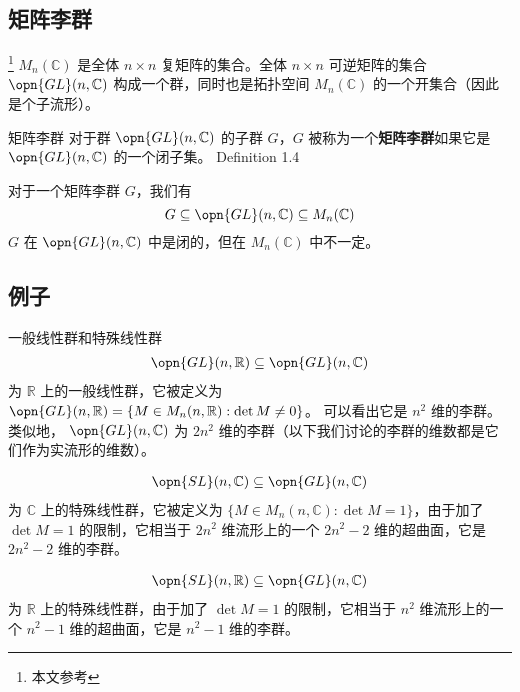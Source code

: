 
\begin{issues}
\issueDraft
\end{issues}


\subsection{矩阵李群}

\footnote{本文参考\cite{GTM222}} $M_n(\mathbb{C})$ 是全体 $n \times n$ 复矩阵的集合。全体 $n \times n$ 可逆矩阵的集合 $\opn{GL}(n, \mathbb{C})$ 构成一个群，同时也是拓扑空间 $M_n(\mathbb{C})$ 的一个开集合（因此是个子流形）。

\begin{definition}{矩阵李群}
对于群 $\opn{GL}(n, \mathbb{C})$ 的子群 $G$，$G$ 被称为一个\textbf{矩阵李群}如果它是 $\opn{GL}(n, \mathbb{C})$ 的一个闭子集。 Definition 1.4 \cite{GTM222} 
\end{definition}

对于一个矩阵李群 $G$，我们有
$$
G \subseteq \opn{GL}(n, \mathbb{C}) \subseteq M_n(\mathbb{C})
$$
$G$ 在 $\opn{GL}(n, \mathbb{C})$ 中是闭的，但在 $M_n(\mathbb{C})$ 中不一定。

\subsection{例子}

\begin{example}{一般线性群和特殊线性群}
\begin{equation}
\begin{aligned}
\opn{GL}(n, \mathbb{R}) \subseteq \opn{GL}(n, \mathbb{C})
\end{aligned}
\end{equation}
为 $\mathbb R$ 上的一般线性群，它被定义为 $\opn{GL}(n,\mathbb R)=\{M\in M_n(n,\mathbb{R}): \det M\neq 0 \}$。
可以看出它是 $n^2$ 维的李群。类似地， ${\opn{GL}(n,\mathbb{C})}$ 为 $2n^2$ 维的李群（以下我们讨论的李群的维数都是它们作为实流形的维数）。

\begin{equation}
\begin{aligned}
\opn{SL}(n, \mathbb{C}) \subseteq \opn{GL}(n, \mathbb{C})
\end{aligned}
\end{equation}
为 $\mathbb C$ 上的特殊线性群，它被定义为 $\{M\in M_n(n,\mathbb{C}): \det M=1 \}$，由于加了 $\det M=1$ 的限制，它相当于 $2n^2$ 维流形上的一个 $2n^2-2$ 维的超曲面，它是 $2n^2-2$ 维的李群。

\begin{equation}
\begin{aligned}
\opn{SL}(n, \mathbb{R}) \subseteq \opn{GL}(n, \mathbb{C})
\end{aligned}
\end{equation}
为 $\mathbb R$ 上的特殊线性群，由于加了 $\det M=1$ 的限制，它相当于 $n^2$ 维流形上的一个 $n^2-1$ 维的超曲面，它是 $n^2-1$ 维的李群。
\end{example}

